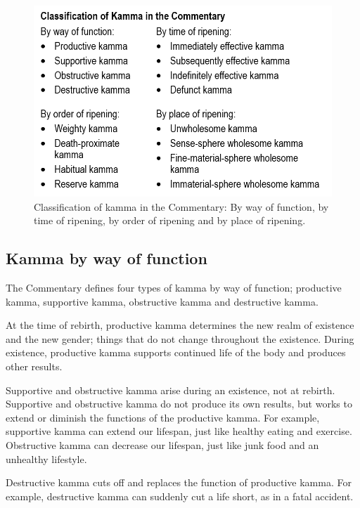 \begin{figure}[h]
\centering
\includegraphics[width=0.7\linewidth]{./Diagrams/Classifications}
\caption{Classification of kamma in the Commentary: By way of function, by time of ripening, by order of ripening and by place of ripening.}
\label{fig:Classifications}
\end{figure}

\subsection*{Kamma by way of function}

The Commentary defines four types of kamma by way of function; productive kamma, supportive kamma, obstructive kamma and destructive kamma.

At the time of rebirth, productive kamma determines the new realm of existence and the new gender; things that do not change throughout the existence. During existence, productive kamma supports continued life of the body and produces other results.

Supportive and obstructive kamma arise during an existence, not at rebirth. Supportive and obstructive kamma do not produce its own results, but works to extend or diminish the functions of the productive kamma. For example, supportive kamma can extend our lifespan, just like healthy eating and exercise. Obstructive kamma can decrease our lifespan, just like junk food and an unhealthy lifestyle.

Destructive kamma cuts off and replaces the function of productive kamma. For example, destructive kamma can suddenly cut a life short, as in a fatal accident.

